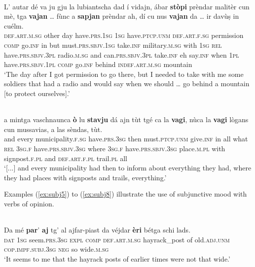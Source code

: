 \ea
\label{ex:free.ind2}
\\
\gll  L’ autar dé va ju gju la lubiantscha dad í vidajn, ábar \textbf{stòpi} prèndar malitèr cun mè, tga \textbf{vajan} … fùnc a \textbf{sapjan} prèndar ah, dí cu nus \textbf{vajan} da … ir davùṣ in cuélm.\\
\textsc{def.art.m.sg} other day have.\textsc{prs.1sg} \textsc{1sg} have.\textsc{ptcp.unm} \textsc{def.art.f.sg} permission \textsc{comp} go.\textsc{inf} in but must.\textsc{prs.sbjv.1sg}  take.\textsc{inf} military.\textsc{m.sg} with \textsc{1sg} \textsc{rel} have.\textsc{prs.sbjv.3pl} {} radio.\textsc{m.sg} and can.\textsc{prs.sbjv.3pl} take.\textsc{inf} eh say.\textsc{inf} when \textsc{1pl} have.\textsc{prs.sbjv.1pl} \textsc{comp} {} go.\textsc{inf} behind \textsc{indef.art.m.sg} mountain\\
\glt `The day after I got permission to go there, but I needed to take with me some soldiers that had a radio and would say when we should … go behind a mountain [to protect ourselves].'
\z

\ea
\label{ex:free.ind3}
\\
\gll [...] a mintga vaschnaunca \textbf{ò} lu \textbf{stavju} dá ajn tùt tgé ca la \textbf{vagi}, nùca la \textbf{vagi} lògans cun mussavias, a las sèndas, tùt.\\
{} and every municipality.\textsc{f.sg} have.\textsc{prs.3sg} then must.\textsc{ptcp.unm} give.\textsc{inf} in all what \textsc{rel} \textsc{3sg.f} have.\textsc{prs.sbjv.3sg} where \textsc{3sg.f} have.\textsc{prs.sbjv.3sg} place.\textsc{m.pl} with signpost.\textsc{f.pl} and \textsc{def.art.f.pl} trail.\textsc{pl} all \\
\glt `[...] and every municipality had then to inform about everything they had, where they had places with signposts and trails, everything.'
\z

Examples (\ref{ex:subj5}) to (\ref{ex:subj8}) illustrate the use of subjunctive mood with verbs of opinion.

\ea
\label{ex:subj5}
\\
\gll  Da mé \textbf{par}' \textbf{aj} tg' al ajfar-piast da véjdar \textbf{èri} bétga schi lads.\\
\textsc{dat} \textsc{1sg} seem.\textsc{prs.3sg} \textsc{expl} \textsc{comp} \textsc{def.art.m.sg} hayrack\_post  of old.\textsc{adj.unm} \textsc{cop.impf.subj.3sg} \textsc{neg} so wide.\textsc{m.sg} \\
\glt `It seems to me that the hayrack posts of earlier times were not that wide.'
\z

